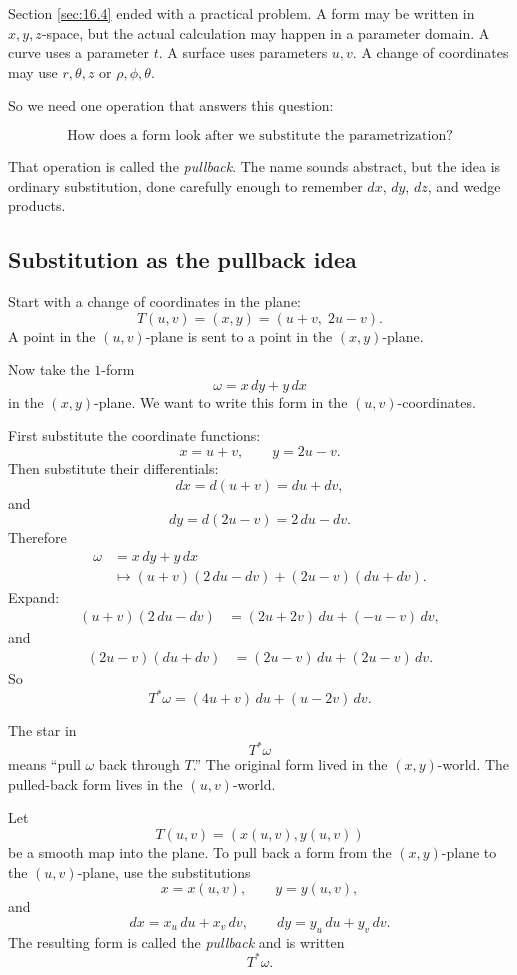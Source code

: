 Section \ref{sec:16.4} ended with a practical problem.  A form may be written in
\(x,y,z\)-space, but the actual calculation may happen in a parameter domain.  A curve
uses a parameter \(t\).  A surface uses parameters \(u,v\).  A change of coordinates may
use \(r,\theta,z\) or \(\rho,\phi,\theta\).

So we need one operation that answers this question:

\[
    \text{How does a form look after we substitute the parametrization?}
\]

That operation is called the \emph{pullback}.  The name sounds abstract, but the idea is
ordinary substitution, done carefully enough to remember \(dx\), \(dy\), \(dz\), and
wedge products.

\subsection{Substitution as the pullback idea}

Start with a change of coordinates in the plane:
\[
    T(u,v)=(x,y)=(u+v,\;2u-v).
\]
A point in the \((u,v)\)-plane is sent to a point in the \((x,y)\)-plane.

Now take the \(1\)-form
\[
    \omega=x\,dy+y\,dx
\]
in the \((x,y)\)-plane.  We want to write this form in the \((u,v)\)-coordinates.

First substitute the coordinate functions:
\[
    x=u+v,
    \qquad
    y=2u-v.
\]
Then substitute their differentials:
\[
    dx=d(u+v)=du+dv,
\]
and
\[
    dy=d(2u-v)=2\,du-dv.
\]
Therefore
\[
\begin{aligned}
    \omega
    &=
    x\,dy+y\,dx\\
    &\longmapsto
    (u+v)(2\,du-dv)+(2u-v)(du+dv).
\end{aligned}
\]
Expand:
\[
\begin{aligned}
    (u+v)(2\,du-dv)
    &=
    (2u+2v)\,du+(-u-v)\,dv,
\end{aligned}
\]
and
\[
\begin{aligned}
    (2u-v)(du+dv)
    &=
    (2u-v)\,du+(2u-v)\,dv.
\end{aligned}
\]
So
\[
\boxed{
    T^*\omega=(4u+v)\,du+(u-2v)\,dv.
}
\]

The star in
\[
    T^*\omega
\]
means ``pull \(\omega\) back through \(T\).''  The original form lived in the
\((x,y)\)-world.  The pulled-back form lives in the \((u,v)\)-world.

\begin{definition}
Let
\[
    T(u,v)=(x(u,v),y(u,v))
\]
be a smooth map into the plane.  To pull back a form from the \((x,y)\)-plane to the
\((u,v)\)-plane, use the substitutions
\[
    x=x(u,v),
    \qquad
    y=y(u,v),
\]
and
\[
    dx=x_u\,du+x_v\,dv,
    \qquad
    dy=y_u\,du+y_v\,dv.
\]
The resulting form is called the \emph{pullback} and is written
\[
    T^*\omega.
\]
\end{definition}

